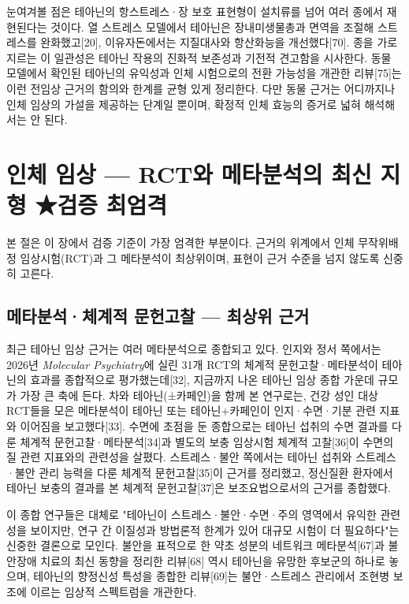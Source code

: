 \documentclass[12pt,oneside]{book}
\begin{document}
눈여겨볼 점은 테아닌의 항스트레스·장 보호 표현형이 설치류를 넘어 여러 종에서 재현된다는 것이다. 열 스트레스 모델에서 테아닌은 장내미생물총과 면역을 조절해 스트레스를 완화했고[20], 이유자돈에서는 지질대사와 항산화능을 개선했다[70]. 종을 가로지르는 이 일관성은 테아닌 작용의 진화적 보존성과 기전적 견고함을 시사한다. 동물 모델에서 확인된 테아닌의 유익성과 인체 시험으로의 전환 가능성을 개관한 리뷰[75]는 이런 전임상 근거의 함의와 한계를 균형 있게 정리한다. 다만 동물 근거는 어디까지나 인체 임상의 가설을 제공하는 단계일 뿐이며, 확정적 인체 효능의 증거로 넓혀 해석해서는 안 된다.

\section{인체 임상 — RCT와 메타분석의 최신 지형 ★검증 최엄격}

본 절은 이 장에서 검증 기준이 가장 엄격한 부분이다. 근거의 위계에서 인체 무작위배정 임상시험(RCT)과 그 메타분석이 최상위이며, 표현이 근거 수준을 넘지 않도록 신중히 고른다.

\subsection{메타분석·체계적 문헌고찰 — 최상위 근거}

최근 테아닌 임상 근거는 여러 메타분석으로 종합되고 있다. 인지와 정서 쪽에서는 2026년 \textit{Molecular Psychiatry}에 실린 31개 RCT의 체계적 문헌고찰·메타분석이 테아닌의 효과를 종합적으로 평가했는데[32], 지금까지 나온 테아닌 임상 종합 가운데 규모가 가장 큰 축에 든다. 차와 테아닌(±카페인)을 함께 본 연구로는, 건강 성인 대상 RCT들을 모은 메타분석이 테아닌 또는 테아닌+카페인이 인지·수면·기분 관련 지표와 이어짐을 보고했다[33]. 수면에 초점을 둔 종합으로는 테아닌 섭취의 수면 결과를 다룬 체계적 문헌고찰·메타분석[34]과 별도의 보충 임상시험 체계적 고찰[36]이 수면의 질 관련 지표와의 관련성을 살폈다. 스트레스·불안 쪽에서는 테아닌 섭취와 스트레스·불안 관리 능력을 다룬 체계적 문헌고찰[35]이 근거를 정리했고, 정신질환 환자에서 테아닌 보충의 결과를 본 체계적 문헌고찰[37]은 보조요법으로서의 근거를 종합했다.

이 종합 연구들은 대체로 "테아닌이 스트레스·불안·수면·주의 영역에서 유익한 관련성을 보이지만, 연구 간 이질성과 방법론적 한계가 있어 대규모 시험이 더 필요하다"는 신중한 결론으로 모인다. 불안을 표적으로 한 약초 성분의 네트워크 메타분석[67]과 불안장애 치료의 최신 동향을 정리한 리뷰[68] 역시 테아닌을 유망한 후보군의 하나로 놓으며, 테아닌의 향정신성 특성을 종합한 리뷰[69]는 불안·스트레스 관리에서 조현병 보조에 이르는 임상적 스펙트럼을 개관한다.
\end{document}
